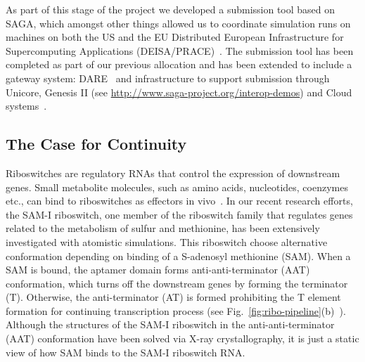 \documentclass[a4paper,11pt]{article}
\begin{document}
As part of this stage of the project we developed a submission tool based on SAGA, which amongst other things allowed us to coordinate simulation runs on machines on both the US and the EU Distributed European Infrastructure for Supercomputing Applications (DEISA/PRACE)~\cite{DEISA-PRACE}. The submission tool has been completed as part of our previous allocation and has been extended to include a gateway system: DARE~\cite{dare-tg11} and infrastructure to support submission through Unicore, Genesis II (see \url{http://www.saga-project.org/interop-demos}) and Cloud systems~\cite{pstar11}.

\subsection{The Case for Continuity}

Riboswitches are regulatory RNAs that control the expression of downstream genes. Small metabolite molecules, such as amino acids, nucleotides, coenzymes etc., can bind to riboswitches as effectors in vivo~\cite{mandal}.  In our recent research efforts, the SAM-I riboswitch, one member of the riboswitch family that regulates genes related to the metabolism of sulfur and methionine, has been extensively investigated with atomistic simulations.  This riboswitch choose alternative conformation depending on binding of a S-adenosyl methionine (SAM).  When a SAM is bound, the aptamer domain forms anti-anti-terminator (AAT) conformation, which turns off the downstream genes by forming the terminator (T). Otherwise, the anti-terminator (AT) is formed prohibiting the T element formation for continuing transcription process (see Fig.~\ref{fig:ribo-pipeline}(b)~\cite{brooke}).  Although the structures of the SAM-I riboswitch in the anti-anti-terminator (AAT) conformation have been solved via X-ray crystallography, it is just a static view of how SAM binds to the SAM-I riboswitch RNA.
\end{document}
